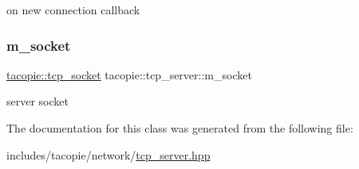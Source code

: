 on new connection callback \mbox{\label{classtacopie_1_1tcp__server_a2838c1b655a8c4f5ccb1e157afc17284}} 
\subsubsection{\texorpdfstring{m\+\_\+socket}{m\_socket}}
{\footnotesize\ttfamily \hyperlink{classtacopie_1_1tcp__socket}{tacopie\+::tcp\+\_\+socket} tacopie\+::tcp\+\_\+server\+::m\+\_\+socket\hspace{0.3cm}{\ttfamily [private]}}

server socket 

The documentation for this class was generated from the following file\+:\begin{DoxyCompactItemize}
\item 
includes/tacopie/network/\hyperlink{tcp__server_8hpp}{tcp\+\_\+server.\+hpp}\end{DoxyCompactItemize}
